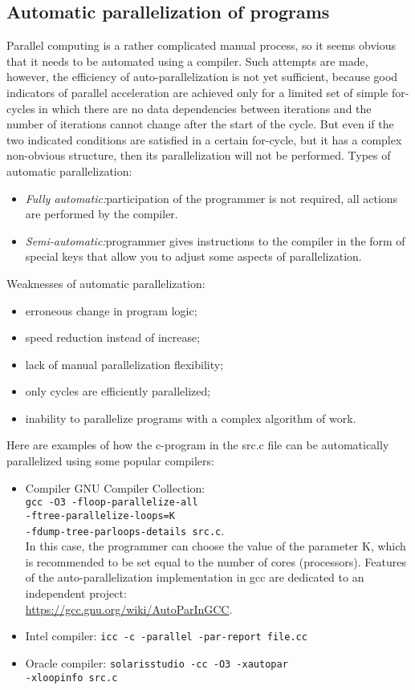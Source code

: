 { %
	\subsection{Automatic parallelization of programs}
	\par Parallel computing is a rather complicated manual process, so it seems obvious that it needs to be automated using a compiler. Such attempts are made, however, the efficiency of auto-parallelization is not yet sufficient, because good indicators of parallel acceleration are achieved only for a limited set of simple for-cycles in which there are no data dependencies between iterations and the number of iterations cannot change after the start of the cycle. But even if the two indicated conditions are satisfied in a certain for-cycle, but it has a complex non-obvious structure, then its parallelization will not be performed. Types of automatic parallelization:
	\begin{itemize}
		\item\textit{Fully automatic:}\quad participation of the programmer is not required, all actions are performed by the compiler.
		\item\textit{Semi-automatic:}\quad programmer gives instructions to the compiler in the form of special keys that allow you to adjust some aspects of parallelization.
	\end{itemize}
	\par Weaknesses of automatic parallelization:
	\begin{itemize}
		\item erroneous change in program logic;
		\item speed reduction instead of increase;
		\item lack of manual parallelization flexibility;
		\item only cycles are efficiently parallelized;
		\item inability to parallelize programs with a complex algorithm of work.
	\end{itemize}
	\par Here are examples of how the c-program in the src.c file can be automatically parallelized using some popular compilers:
	\begin{itemize}
		\item Compiler GNU Compiler Collection:	 \\
\texttt{gcc -O3 -floop-parallelize-all \\-ftree-parallelize-loops=K \\-fdump-tree-parloops-details src.c}. \\ In this case, the programmer can choose the value of the parameter K, which is recommended to be set equal to the number of cores (processors). Features of the auto-parallelization implementation in gcc are dedicated to an independent project:\\ \url{https://gcc.gnu.org/wiki/AutoParInGCC}. 
		\item Intel compiler:	 
\texttt{icc -c -parallel -par-report file.cc}
		\item Oracle compiler:	 
\texttt{solarisstudio -cc -O3 -xautopar \\-xloopinfo src.c}
	\end{itemize}
}
